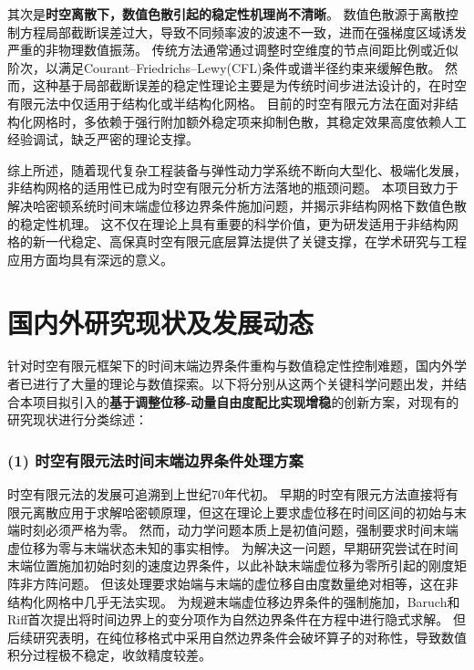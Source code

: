其次是\textbf{时空离散下，数值色散引起的稳定性机理尚不清晰}。
数值色散源于离散控制方程局部截断误差过大，导致不同频率波的波速不一致，进而在强梯度区域诱发严重的非物理数值振荡。
传统方法通常通过调整时空维度的节点间距比例或近似阶次，以满足Courant–Friedrichs–Lewy(CFL)条件或谱半径约束来缓解色散。
然而，这种基于局部截断误差的稳定性理论主要是为传统时间步进法设计的，在时空有限元法中仅适用于结构化或半结构化网格。
目前的时空有限元方法在面对非结构化网格时，多依赖于强行附加额外稳定项来抑制色散，其稳定效果高度依赖人工经验调试，缺乏严密的理论支撑。

综上所述，随着现代复杂工程装备与弹性动力学系统不断向大型化、极端化发展，非结构网格的适用性已成为时空有限元分析方法落地的瓶颈问题。
本项目致力于解决哈密顿系统时间末端虚位移边界条件施加问题，并揭示非结构网格下数值色散的稳定性机理。
这不仅在理论上具有重要的科学价值，更为研发适用于非结构网格的新一代稳定、高保真时空有限元底层算法提供了关键支撑，在学术研究与工程应用方面均具有深远的意义。

\newpage

\section{\bfseries 国内外研究现状及发展动态}

针对时空有限元框架下的时间末端边界条件重构与数值稳定性控制难题，国内外学者已进行了大量的理论与数值探索。以下将分别从这两个关键科学问题出发，并结合本项目拟引入的\textbf{基于调整位移-动量自由度配比实现增稳}的创新方案，对现有的研究现状进行分类综述：

\subsubsection*{\bfseries (1) 时空有限元法时间末端边界条件处理方案}

时空有限元法的发展可追溯到上世纪70年代初。
早期的时空有限元方法直接将有限元离散应用于求解哈密顿原理，但这在理论上要求虚位移在时间区间的初始与末端时刻必须严格为零。
然而，动力学问题本质上是初值问题，强制要求时间末端虚位移为零与末端状态未知的事实相悖。
为解决这一问题，早期研究尝试在时间末端位置施加初始时刻的速度边界条件，以此补缺末端虚位移为零所引起的刚度矩阵非方阵问题。
但该处理要求始端与末端的虚位移自由度数量绝对相等，这在非结构化网格中几乎无法实现。
为规避末端虚位移边界条件的强制施加，Baruch和Riff首次提出将时间边界上的变分项作为自然边界条件在方程中进行隐式求解。
但后续研究表明，在纯位移格式中采用自然边界条件会破坏算子的对称性，导致数值积分过程极不稳定，收敛精度较差。

